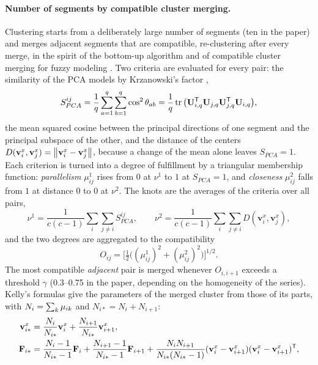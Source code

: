 \paragraph{Number of segments by compatible cluster merging.} Clustering starts from a deliberately large number of segments (ten in the paper) and merges adjacent segments that are compatible, re-clustering after every merge, in the spirit of the bottom-up algorithm and of compatible cluster merging for fuzzy modeling \cite{kaymak:1995:merging}. Two criteria are evaluated for every pair: the similarity of the PCA models by Krzanowski's factor \cite{krzanowski:1979:pca},
\begin{equation}
  S^{ij}_{PCA}=\frac1q\sum_{a=1}^{q}\sum_{b=1}^{q}\cos^2\theta_{ab}=\frac1q\operatorname{tr}\big(\mathbf{U}_{i,q}^{\mathsf{T}}\mathbf{U}_{j,q}\mathbf{U}_{j,q}^{\mathsf{T}}\mathbf{U}_{i,q}\big),
  \label{eq:ts:spca}
\end{equation}
the mean squared cosine between the principal directions of one segment and the principal subspace of the other, and the distance of the centers $D(\mathbf{v}^x_i,\mathbf{v}^x_j)=\left\lVert \mathbf{v}^x_i-\mathbf{v}^x_j \right\rVert$, because a change of the mean alone leaves $S_{PCA}=1$. Each criterion is turned into a degree of fulfillment by a triangular membership function: \emph{parallelism} $\mu^1_{ij}$ rises from $0$ at $\nu^1$ to $1$ at $S_{PCA}=1$, and \emph{closeness} $\mu^2_{ij}$ falls from $1$ at distance $0$ to $0$ at $\nu^2$. The knots are the averages of the criteria over all pairs,
\begin{equation}
  \nu^1=\frac{1}{c(c-1)}\sum_{i}\sum_{j\ne i}S^{ij}_{PCA},\qquad
  \nu^2=\frac{1}{c(c-1)}\sum_{i}\sum_{j\ne i}D(\mathbf{v}^x_i,\mathbf{v}^x_j),
  \label{eq:ts:knots}
\end{equation}
and the two degrees are aggregated to the compatibility
\begin{equation}
  O_{ij}=\Big[\tfrac12\big((\mu^1_{ij})^2+(\mu^2_{ij})^2\big)\Big]^{1/2}.
  \label{eq:ts:compat}
\end{equation}
The most compatible \emph{adjacent} pair is merged whenever $O_{i,i+1}$ exceeds a threshold $\gamma$ (0.3--0.75 in the paper, depending on the homogeneity of the series). Kelly's formulas \cite{kelly:1994:merging} give the parameters of the merged cluster from those of its parts, with $N_i=\sum_k\mu_{ik}$ and $N_{i*}=N_i+N_{i+1}$:
\begin{equation}
  \begin{aligned}
  \mathbf{v}^x_{i*}&=\frac{N_i}{N_{i*}}\mathbf{v}^x_i+\frac{N_{i+1}}{N_{i*}}\mathbf{v}^x_{i+1},\\
  \mathbf{F}_{i*}&=\frac{N_i-1}{N_{i*}-1}\mathbf{F}_i+\frac{N_{i+1}-1}{N_{i*}-1}\mathbf{F}_{i+1}+\frac{N_iN_{i+1}}{N_{i*}(N_{i*}-1)}(\mathbf{v}^x_i-\mathbf{v}^x_{i+1})(\mathbf{v}^x_i-\mathbf{v}^x_{i+1})^{\mathsf{T}},
  \end{aligned}
  \label{eq:ts:kelly}
\end{equation}
